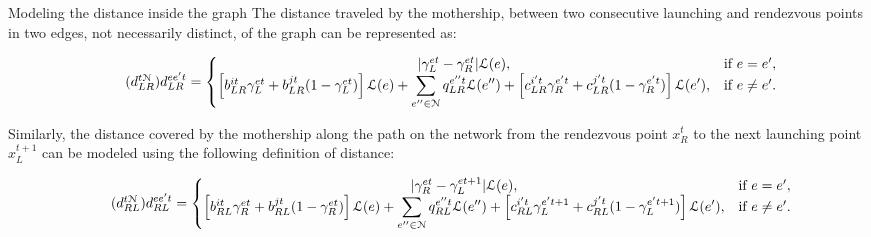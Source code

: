 \documentclass[slidestop,usepdftitle=false,10pt]{beamer}
\begin{document}
	\begin{frame}{Modeling the distance inside the graph}
    	The distance traveled by the mothership, between two consecutive launching and rendezvous points in two edges, not necessarily distinct,  of the graph can be represented as:
    	\begin{tiny}
        	\begin{equation}\tag{$d^{t\mathcal N}_{LR}$}\label{eq:dLRNt}
            d_{LR}^{ee't} = \left\{\begin{matrix}
            |\gamma_{L}^{et} - \gamma_{R}^{et}|\mathcal L(e), & \text{if } e = e',\\
            \left[b_{LR}^{it}\gamma_{L}^{et} + b_{LR}^{jt}(1 - \gamma_{L}^{et})\right]\mathcal L(e) + \displaystyle \sum_{e''\in \mathcal N}q_{LR}^{e''t}\mathcal L(e'') + \left[c_{LR}^{i't}\gamma_{R}^{e't} + c_{LR}^{j't}(1 - \gamma_{R}^{e't})\right]\mathcal{L}(e'), & \text{if } e \neq e'.
            \end{matrix}\right.
            \end{equation}
    	\end{tiny}
    	
        Similarly, the distance covered by the mothership along the path on the network from the rendezvous point $x_R^t$ to the next launching point $x_L^{t+1}$ can be modeled using the following definition of distance:
        
        \begin{tiny}
            \begin{equation}\tag{$d^{t\mathcal N}_{RL}$}\label{eq:dRLNt}
            d_{RL}^{ee't} = \left\{\begin{matrix}
            |\gamma_{R}^{et} - \gamma_{L}^{et+1}|\mathcal L(e), & \text{if } e = e',\\
            \left[b_{RL}^{it}\gamma_{R}^{et} + b_{RL}^{jt}(1 - \gamma_{R}^{et})\right]\mathcal L(e) + \displaystyle \sum_{e''\in \mathcal N}q_{RL}^{e''t}\mathcal L(e'') + \left[c_{RL}^{i't}\gamma_{L}^{e't+1} + c_{RL}^{j't}(1 - \gamma_{L}^{e't+1})\right]\mathcal{L}(e'), & \text{if } e \neq e'.
            \end{matrix}\right.
            \end{equation}
        \end{tiny}
	\end{frame}
	
\end{document}
